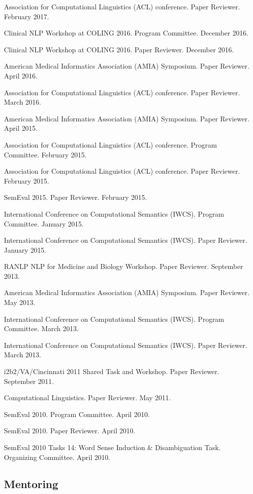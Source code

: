 \documentclass[letterpaper]{article}
\renewenvironment{itemize}{
  \begin{list}{}{
    \setlength{\leftmargin}{1.5em}
  }
}{
  \end{list}
}
\begin{document}
\begin{itemize}
\item Association for Computational Linguistics (ACL) conference. Paper Reviewer. February 2017.
\item Clinical NLP Workshop at COLING 2016. Program Committee. December 2016.
\item Clinical NLP Workshop at COLING 2016. Paper Reviewer. December 2016.
\item American Medical Informatics Association (AMIA) Symposium. Paper Reviewer. April 2016.
\item Association for Computational Linguistics (ACL) conference. Paper Reviewer. March 2016.
\item American Medical Informatics Association (AMIA) Symposium. Paper Reviewer. April 2015.
\item Association for Computational Linguistics (ACL) conference. Program Committee. February 2015.
\item Association for Computational Linguistics (ACL) conference. Paper Reviewer. February 2015.
\item SemEval 2015. Paper Reviewer. February 2015.
\item International Conference on Computational Semantics (IWCS). Program Committee. January 2015.
\item International Conference on Computational Semantics (IWCS). Paper Reviewer. January 2015.
\item RANLP NLP for Medicine and Biology Workshop. Paper Reviewer. September 2013.
\item American Medical Informatics Association (AMIA) Symposium. Paper Reviewer. May 2013.
\item International Conference on Computational Semantics (IWCS). Program Committee. March 2013.
\item International Conference on Computational Semantics (IWCS). Paper Reviewer. March 2013.
\item i2b2/VA/Cincinnati 2011 Shared Task and Workshop. Paper Reviewer. September 2011.
\item Computational Linguistics. Paper Reviewer. May 2011.
\item SemEval 2010. Program Committee. April 2010.
\item SemEval 2010. Paper Reviewer. April 2010.
\item SemEval 2010 Tasks 14: Word Sense Induction \& Disambiguation Task. Organizing Committee. April 2010.
\end{itemize}

\subsection*{Mentoring}
\end{document}
